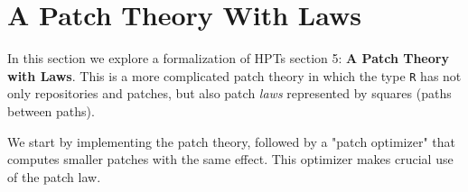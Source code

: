 \section{A Patch Theory With Laws}\label{sec/laws-noTrunc-noIndep}

In this section we explore a formalization of HPTs section 5: \textbf{A Patch Theory with Laws}.
This is a more complicated patch theory in which the type \texttt{R} has not only repositories
and patches, but also patch \emph{laws} represented by squares (paths between paths).

We start by implementing the patch theory, followed by a "patch optimizer" that computes
smaller patches with the same effect. This optimizer makes crucial use of the patch law.

\begin{code}[hide]%
\>[0]\AgdaSymbol{\{-\#}\AgdaSpace{}%
\AgdaSpace{}%
\AgdaSpace{}%
\AgdaSymbol{\#-\}}\<%
\\
%
\\[\AgdaEmptyExtraSkip]%
\>[0]\AgdaSpace{}%
\AgdaSpace{}%
\<%
\\
%
\\[\AgdaEmptyExtraSkip]%
\>[0]\AgdaSpace{}%
\AgdaSpace{}%
\AgdaSpace{}%
\<%
\\
\>[0][@{}l@{\AgdaIndent{0}}]%
\>[2]\AgdaSymbol{(}%
\>[13]\AgdaSymbol{;}\AgdaSpace{}%
\AgdaOperator{\AgdaFunction{\#\AgdaUnderscore{}}}\AgdaSpace{}%
\AgdaSymbol{;}\AgdaSpace{}%
\AgdaSpace{}%
\AgdaSymbol{;}\AgdaSpace{}%
\AgdaSymbol{)}\<%
\\
\>[0]\AgdaSpace{}%
\AgdaSpace{}%
\<%
\\
\>[0][@{}l@{\AgdaIndent{0}}]%
\>[2]\AgdaSymbol{(}\AgdaSpace{}%
\AgdaSymbol{;}\AgdaSpace{}%
\AgdaSpace{}%
\AgdaSymbol{;}\AgdaSpace{}%
\AgdaOperator{\AgdaFunction{\AgdaUnderscore{}==\AgdaUnderscore{}}}\AgdaSymbol{)}\<%
\\
\>[0]\AgdaSpace{}%
\AgdaSpace{}%
\AgdaSpace{}%
\<%
\\
\>[0][@{}l@{\AgdaIndent{0}}]%
\>[2]\AgdaSymbol{(}\AgdaSpace{}%

\end{code}
